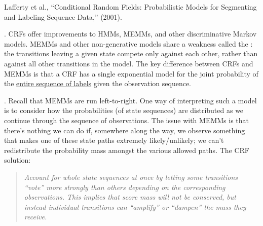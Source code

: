 \documentclass[11pt]{article}
\newcommand\myspace[1][]{\vspace{#1\bigskipamount}}
\newcommand\p{\Needspace{10\baselineskip} \noindent}
\begin{document}

\vspace{-1em}
{\footnotesize Lafferty et al., ``Conditional Random Fields: Probabilistic Models for Segmenting and Labeling Sequence Data,'' (2001).}

\p {}. CRFs offer improvements to HMMs, MEMMs, and other discriminative Markov models. MEMMs and other non-generative models share a weakness called the : the transitions leaving a given
state compete only against each other, rather than against all other transitions in the model. The key difference between CRFs and MEMMs is that a CRF has a single exponential model for the joint probability of the \underline{entire sequence of labels} given the observation sequence.

\myspace
\p {}. Recall that MEMMs are run left-to-right. One way of interpreting such a model is to consider how the probabilities (of state sequences) are distributed as we continue through the sequence of observations. The issue with MEMMs is that there's nothing we can do if, somewhere along the way, we observe something that makes one of these state paths extremely likely/unlikely; we can't redistribute the probability mass amongst the various allowed paths. The CRF solution:
\vspace{-1em}
\begin{quote}
	{\small \textit{Account for whole state sequences at once by letting some transitions ``vote''
			more strongly than others depending on the corresponding observations. This implies that score mass will not be conserved, but instead individual transitions can ``amplify'' or
			``dampen'' the mass they receive.}}
\end{quote}
\end{document}
